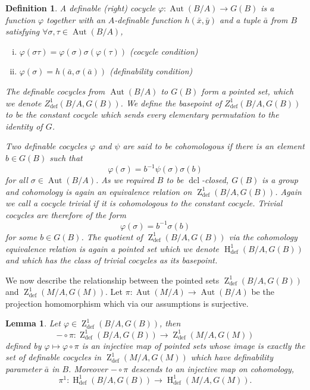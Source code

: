\documentclass{article}
\theoremstyle{problemstyle}
\newtheorem{definition}[problem]{Definition}
\newtheorem{lemma}[problem]{Lemma}
\DeclareMathOperator{\defin}{def} %
\DeclareMathOperator{\aut}{Aut} %
\DeclareMathOperator{\HH}{H} %
\DeclareMathOperator{\ZZ}{Z} %
\DeclareMathOperator{\dcl}{dcl} %
\newcommand{\xx}{\bar{x}}
\newcommand{\yy}{\bar{y}}
\newcommand{\aaa}{\bar{a}}
\begin{document}
\begin{definition}\label{def coycle}
    A definable (right) cocycle $\varphi:\aut(B/A) \to G(B)$ is a function $\varphi$ together with an $A$-definable function $h(\xx,\yy)$ and a tuple $\aaa$ from $B$ satisfying $\forall \sigma, \tau \in \aut(B/A)$,

\begin{enumerate}[(i)]
    \item $\varphi(\sigma\tau) = \varphi(\sigma)\sigma(\varphi(\tau))$ (cocycle condition)
    \item $\varphi(\sigma) = h(\aaa,\sigma(\aaa))$ (definability condition)
\end{enumerate}

The definable cocycles from $\aut(B/A)$ to $G(B)$ form a pointed set, which we denote $Z^1_{\defin}(B/A,G(B))$. We define the basepoint of $Z^1_{\defin}(B/A,G(B))$ to be the constant cocycle which sends every elementary permutation to the identity of $G$. 

Two definable cocycles $\varphi$ and $\psi$ are said to be cohomologous if there is an element $b \in G(B)$ such that  $$\varphi(\sigma) = b^{-1}\psi(\sigma)\sigma(b)$$ for all $\sigma \in \aut(B/A)$. As we required $B$ to be $\dcl$-closed, $G(B)$ is a group and cohomology is again an equivalence relation on $\ZZ^1_{\defin}(B/A,G(B))$. Again we call a cocycle trivial if it is cohomologous to the constant cocycle. Trivial cocycles are therefore of the form $$\varphi(\sigma) = b^{-1}\sigma(b)$$ for some $b \in G(B)$. The quotient of $\ZZ^1_{\defin}(B/A,G(B))$ via the cohomology equivalence relation is again a pointed set which we denote $\HH^1_{\defin}(B/A,G(B))$ and which has the class of trivial cocycles as its basepoint. 
\end{definition}

We now describe the relationship between the pointed sets $\ZZ^1_{\defin}(B/A,G(B))$ and $\ZZ^1_{\defin}(M/A,G(M))$. Let $\pi:\aut(M/A) \to \aut(B/A)$ be the projection homomorphism which via our assumptions is surjective. 

\begin{lemma}\label{ZZ inj}
    Let $\varphi \in \ZZ^1_{\defin}(B/A,G(B))$, then $$- \circ\pi: \ZZ^1_{\defin}(B/A,G(B)) \to \ZZ^1_{\defin}(M/A,G(M))$$ defined by $\varphi \mapsto \varphi \circ \pi$ is an injective map of pointed sets whose image is exactly the set of definable cocycles in $\ZZ^1_{\defin}(M/A,G(M))$ which have definability parameter $\bar{a}$ in $B$. Moreover $-\circ \pi$ descends to an injective map on cohomology, $$\pi^1: \HH^1_{\defin}(B/A,G(B)) \to \HH^1_{\defin}(M/A,G(M)).$$
\end{lemma}
\end{document}
